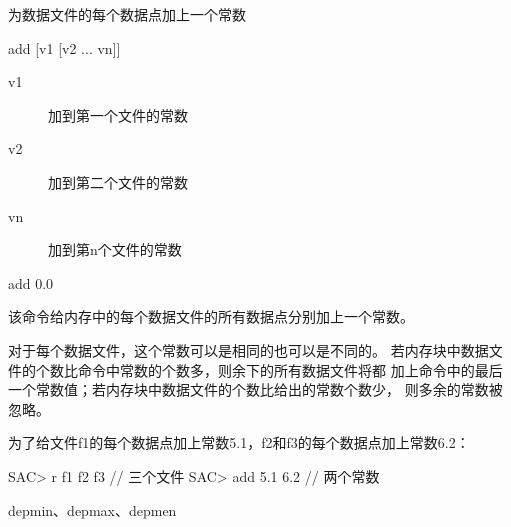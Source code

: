 \label{cmd:add}

为数据文件的每个数据点加上一个常数

\begin{SACSTX}
add [v1 [v2 ... vn]]
\end{SACSTX}

\begin{description}
\item [v1] 加到第一个文件的常数
\item [v2] 加到第二个文件的常数
\item [vn] 加到第n个文件的常数
\end{description}

\begin{SACDFT}
add 0.0
\end{SACDFT}

该命令给内存中的每个数据文件的所有数据点分别加上一个常数。

对于每个数据文件，这个常数可以是相同的也可以是不同的。
若内存块中数据文件的个数比命令中常数的个数多，则余下的所有数据文件将都
加上命令中的最后一个常数值；若内存块中数据文件的个数比给出的常数个数少，
则多余的常数被忽略。

为了给文件f1的每个数据点加上常数5.1，f2和f3的每个数据点加上常数6.2：
\begin{SACCode}
SAC> r f1 f2 f3         // 三个文件
SAC> add 5.1 6.2        // 两个常数
\end{SACCode}

depmin、depmax、depmen

